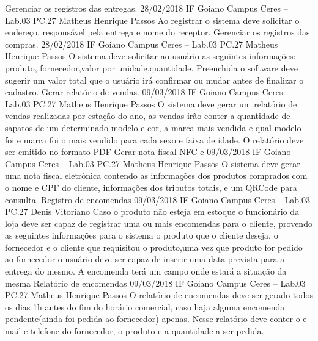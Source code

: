 \begin{center}
		{Gerenciar os registros das entregas.}
		{28/02/2018}
		{IF Goiano Campus Ceres – Lab.03 PC.27}
		{Matheus Henrique Passos}
		{Ao registrar o sistema deve solicitar o endereço, responsável pela entrega e nome do receptor.}
		{Gerenciar os registros das compras.}
		{28/02/2018}
		{IF Goiano Campus Ceres – Lab.03 PC.27}
		{Matheus Henrique Passos}
		{O sistema deve solicitar ao usuário as seguintes informações: produto, fornecedor,valor por unidade,quantidade. Preenchida o software deve sugerir um valor total que o usuário irá confirmar ou mudar antes de finalizar o cadastro.}
        {Gerar relatório de vendas.}
		{09/03/2018}
		{IF Goiano Campus Ceres – Lab.03 PC.27}
		{Matheus Henrique Passos}
		{O sistema deve gerar um relatório de vendas realizadas por estação do ano, as vendas irão conter a quantidade de sapatos de um determinado modelo e cor, a marca mais vendida e qual modelo foi e marca foi o mais vendido para cada sexo e faixa de idade. O relatório deve ser emitido no formato PDF}
        {Gerar nota fiscal NFC-e}
		{09/03/2018}
		{IF Goiano Campus Ceres – Lab.03 PC.27}
		{Matheus Henrique Passos}
		{O sistema deve gerar uma nota fiscal eletrônica contendo as informações dos produtos comprados com o nome e CPF do cliente, informações dos tributos totais, e um QRCode para consulta.}
        {Registro de encomendas}
		{09/03/2018}
		{IF Goiano Campus Ceres – Lab.03 PC.27}
		{Denis Vitoriano}
		{Caso o produto não esteja em estoque o funcionário da loja deve ser capaz de registrar uma ou mais encomendas para o cliente, provendo as seguintes informações para o sistema o produto que o cliente deseja, o fornecedor e o cliente que requisitou o produto,uma vez que produto for pedido ao fornecedor o usuário deve ser capaz de inserir uma data prevista para a entrega do mesmo. A encomenda terá um campo onde estará a situação da mesma}
        {Relatório de encomendas}
		{09/03/2018}
		{IF Goiano Campus Ceres – Lab.03 PC.27}
		{Matheus Henrique Passos}
		{O relatório de encomendas deve ser gerado todos os dias 1h antes do fim do horário comercial, caso haja alguma encomenda pendente(ainda foi pedida ao fornecedor) apenas. Nesse relatório deve conter o e-mail e telefone do fornecedor, o produto e a quantidade a ser pedida. }
\end{center}
